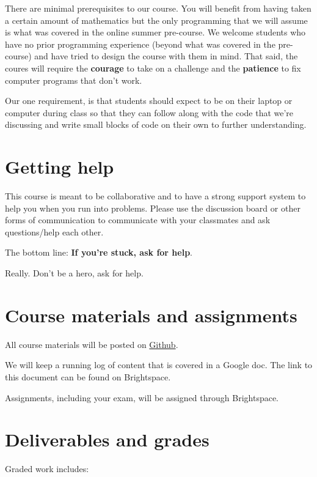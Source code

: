 \documentclass[12pt,pdftex,twoside,letterpaper]{exam}
\begin{document}
  There are minimal prerequisites to our course. You will benefit from having taken a certain
  amount of mathematics but the only programming that we will assume is what was covered in the
  online summer pre-course. We welcome students who have no prior programming experience (beyond
  what was covered in the pre-course) and have tried to design the course with them in mind. That
  said, the coures will require the {\bf courage} to take on a challenge and the {\bf patience} to
  fix computer programs that don't work.

  Our one requirement, is that students should expect to be on their laptop or computer during
  class so that they can follow along with the code that we're discussing and write small blocks
  of code on their own to further understanding.

  \section*{Getting help}

    This course is meant to be collaborative and to have a strong support system to help you when
    you run into problems. Please use the discussion board or other forms of communication to
    communicate with your classmates and ask questions/help each other.

    The bottom line:  {\bf If you're stuck, ask for help\/}.

    Really.  Don't be a hero, ask for help.

  \section*{Course materials and assignments}

    All course materials will be posted on \href{https://github.com/NYU-ComputationalSocialScience/ECON-GA-4002-F2022}{Github}.

    We will keep a running log of content that is covered in a Google doc. The link to this
    document can be found on Brightspace.

    Assignments, including your exam, will be assigned through Brightspace.

  \section*{Deliverables and grades}

    Graded work includes:
\end{document}
